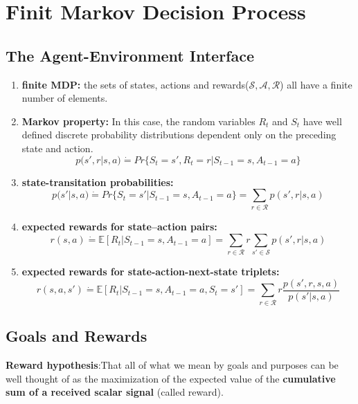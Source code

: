\chapter{Finit Markov Decision Process}
\label{chap:ch_3_Finit_Markov_Decision_Process}

\section{The Agent-Environment Interface}
\begin{enumerate}
    \item \textbf{finite MDP:} the sets of states, actions and rewards($\mathcal{S, A, R}$) all have a finite number of elements.

    \item \textbf{Markov property:} In this case, the random variables $R_t$ and $S_t$ have well defined discrete probability distributions dependent only on the preceding state and action.
    \begin{equation}
        p(s', r|s, a) \dot{=} Pr\{S_t=s', R_t=r|S_{t-1}=s, A_{t-1}=a\}
    \end{equation}

    \item \textbf{state-transitation probabilities:}
    \begin{equation}
        p(s'|s,a) \dot{=} Pr\{S_t=s'|S_{t-1}=s, A_{t-1}=a\} = \sum_{r \in \mathcal{R}}p(s',r|s,a)
    \end{equation}

    \item \textbf{expected rewards for state–action pairs:}
    \begin{equation}
        r(s,a) \dot{=} \mathbb{E}[R_t|S_{t-1}=s, A_{t-1}=a] = \sum_{r \in \mathcal{R}}r\sum_{s' \in \mathcal{S}}p(s',r|s, a)
    \end{equation}

    \item \textbf{expected rewards for state-action-next-state triplets:}
    \begin{equation}
        r(s,a,s') \dot{=} \mathbb{E}[R_t|S_{t-1}=s,A_{t-1}=a, S_t=s']=\sum_{r \in \mathcal{R}}r\frac{p(s',r, s, a)}{p(s'|s,a)}
    \end{equation}
\end{enumerate}

\section{Goals and Rewards}
\textbf{Reward hypothesis}:That all of what we mean by goals and purposes can be well thought of as the maximization of the expected value of the \textbf{cumulative sum of a received scalar signal} (called reward).

